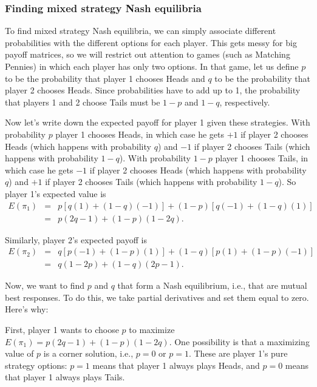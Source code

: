 \subsubsection*{Finding mixed strategy Nash equilibria}

To find mixed strategy Nash equilibria, we can simply associate different probabilities with the different options for each player. This gets messy for big payoff matrices, so we will restrict out attention to games (such as Matching Pennies) in which each player has only two options. In that game, let us define $p$ to be the probability that player 1 chooses Heads and $q$ to be the probability that player 2 chooses Heads. Since probabilities have to add up to 1, the probability that players 1 and 2 choose Tails must be $1-p$ and $1-q$, respectively.

Now let's write down the expected payoff for player 1 given these strategies. With probability $p$ player 1 chooses Heads, in which case he gets $+1$ if player 2 chooses Heads (which happens with probability $q$) and $-1$ if player 2 chooses Tails (which happens with probability $1-q$). With probability $1-p$ player 1 chooses Tails, in which case he gets $-1$ if player 2 chooses Heads (which happens with probability $q$) and $+1$ if player 2 chooses Tails (which happens with probability $1-q$). So player 1's expected value is
\begin{eqnarray*}
E(\pi_1) & = & p[q(1)+(1-q)(-1)]+(1-p)[q(-1)+(1-q)(1)] \\
& = & p(2q-1)+(1-p)(1-2q).
\end{eqnarray*}

Similarly, player 2's expected payoff is
\begin{eqnarray*}
E(\pi_2) & = & q[p(-1)+(1-p)(1)]+(1-q)[p(1)+(1-p)(-1)]\\
& = & q(1-2p)+(1-q)(2p-1).
\end{eqnarray*}

Now, we want to find $p$ and $q$ that form a Nash equilibrium, i.e., that are mutual best responses. To do this, we take partial derivatives and set them equal to zero. Here's why:

First, player 1 wants to choose $p$ to maximize $E(\pi_1) = p(2q-1)+(1-p)(1-2q).$ One possibility is that a maximizing value of $p$ is a corner solution, i.e., $p=0$ or $p=1$. These are player 1's pure strategy options: $p=1$ means that player 1 always plays Heads, and $p=0$ means that player 1 always plays Tails.

